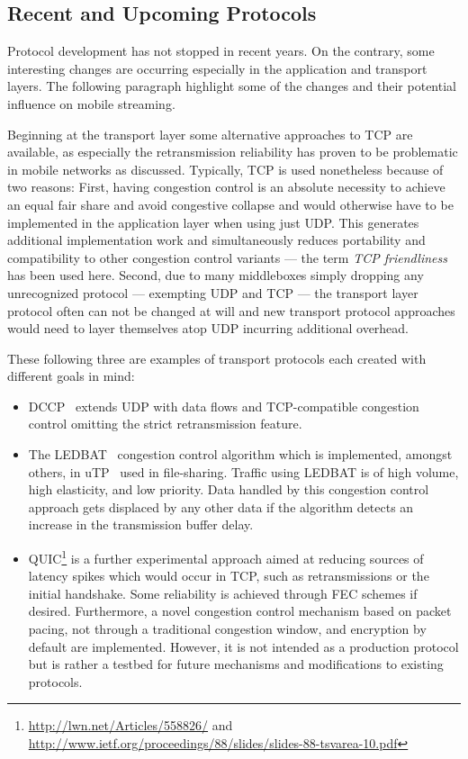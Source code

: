 \subsection{Recent and Upcoming Protocols}

Protocol development has not stopped in recent years. On the contrary, some interesting changes are occurring especially in the application and transport layers. The following paragraph highlight some of the changes and their potential influence on mobile streaming.

Beginning at the transport layer some alternative approaches to \gls{TCP} are available, as especially the retransmission reliability has proven to be problematic in mobile networks as discussed. Typically, \gls{TCP} is used nonetheless because of two reasons: First, having congestion control is an absolute necessity to achieve an equal fair share and avoid congestive collapse and would otherwise have to be implemented in the application layer when using just \gls{UDP}. This generates additional implementation work and simultaneously reduces portability and compatibility to other congestion control variants --- the term \textit{TCP friendliness} has been used here. Second, due to many middleboxes simply dropping any unrecognized protocol --- exempting \gls{UDP} and \gls{TCP} --- the transport layer protocol often can not be changed at will and new transport protocol approaches would need to layer themselves atop \gls{UDP} incurring additional overhead.

These following three are examples of transport protocols each created with different goals in mind:

\begin{itemize}
\item \gls{DCCP}~\cite{rfc4340} extends \gls{UDP} with data flows and \gls{TCP}-compatible congestion control omitting the strict retransmission feature.

\item The \gls{LEDBAT}~\cite{rfc6817} congestion control algorithm which is implemented, amongst others, in \gls{uTP}~\cite{bt2010utp} used in file-sharing. Traffic using \gls{LEDBAT} is of high volume, high elasticity, and low priority. Data handled by this congestion control approach gets displaced by any other data if the algorithm detects an increase in the transmission buffer delay.

\item \gls{QUIC}\footnote{\url{http://lwn.net/Articles/558826/} and \url{http://www.ietf.org/proceedings/88/slides/slides-88-tsvarea-10.pdf}} is a further experimental approach aimed at reducing sources of latency spikes which would occur in \gls{TCP}, such as retransmissions or the initial handshake. Some reliability is achieved through \gls{FEC} schemes if desired. Furthermore, a novel congestion control mechanism based on packet pacing, not through a traditional congestion window, and encryption by default are implemented. However, it is not intended as a production protocol but is rather a testbed for future mechanisms and modifications to existing protocols.
\end{itemize}

